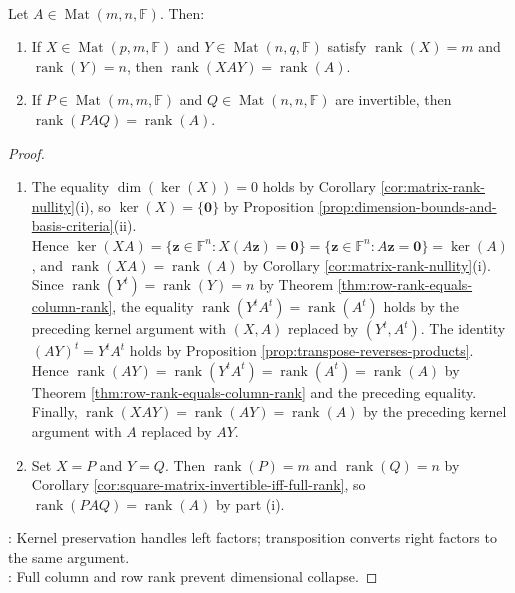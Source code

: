 \begin{theorem} \label{thm:full-rank-products-preserve-rank} \\
Let $A\in\operatorname{Mat}(m,n,\mathbb{F})$. Then:
\begin{enumerate}[label=(\roman*)]
\setlength{\itemsep}{0pt}
\item If $X\in\operatorname{Mat}(p,m,\mathbb{F})$ and $Y\in\operatorname{Mat}(n,q,\mathbb{F})$ satisfy $\operatorname{rank}(X)=m$ and $\operatorname{rank}(Y)=n$, then $\operatorname{rank}(XAY)=\operatorname{rank}(A)$.
\item If $P\in\operatorname{Mat}(m,m,\mathbb{F})$ and $Q\in\operatorname{Mat}(n,n,\mathbb{F})$ are invertible, then $\operatorname{rank}(PAQ)=\operatorname{rank}(A)$.
\end{enumerate}
\begin{proof}
\begin{enumerate}[label=(\roman*)]
\setlength{\itemsep}{0pt}
\item The equality $\dim(\ker(X))=0$ holds by Corollary \ref{cor:matrix-rank-nullity}(i), so $\ker(X)=\{\mathbf{0}\}$ by Proposition \ref{prop:dimension-bounds-and-basis-criteria}(ii).\\
Hence $\ker(XA)=\{\mathbf{z}\in\mathbb{F}^n:X(A\mathbf{z})=\mathbf{0}\}=\{\mathbf{z}\in\mathbb{F}^n:A\mathbf{z}=\mathbf{0}\}=\ker(A)$, and $\operatorname{rank}(XA)=\operatorname{rank}(A)$ by Corollary \ref{cor:matrix-rank-nullity}(i).\\
Since $\operatorname{rank}(Y^t)=\operatorname{rank}(Y)=n$ by Theorem \ref{thm:row-rank-equals-column-rank}, the equality $\operatorname{rank}(Y^tA^t)=\operatorname{rank}(A^t)$ holds by the preceding kernel argument with $(X,A)$ replaced by $(Y^t,A^t)$. The identity $(AY)^t=Y^tA^t$ holds by Proposition \ref{prop:transpose-reverses-products}.\\
Hence $\operatorname{rank}(AY)=\operatorname{rank}(Y^tA^t)=\operatorname{rank}(A^t)=\operatorname{rank}(A)$ by Theorem \ref{thm:row-rank-equals-column-rank} and the preceding equality.\\
Finally, $\operatorname{rank}(XAY)=\operatorname{rank}(AY)=\operatorname{rank}(A)$ by the preceding kernel argument with $A$ replaced by $AY$.
\item Set $X=P$ and $Y=Q$. Then $\operatorname{rank}(P)=m$ and $\operatorname{rank}(Q)=n$ by Corollary \ref{cor:square-matrix-invertible-iff-full-rank}, so $\operatorname{rank}(PAQ)=\operatorname{rank}(A)$ by part (i).
\end{enumerate}
: Kernel preservation handles left factors; transposition converts right factors to the same argument.\\
: Full column and row rank prevent dimensional collapse.
\end{proof}
\end{theorem}
